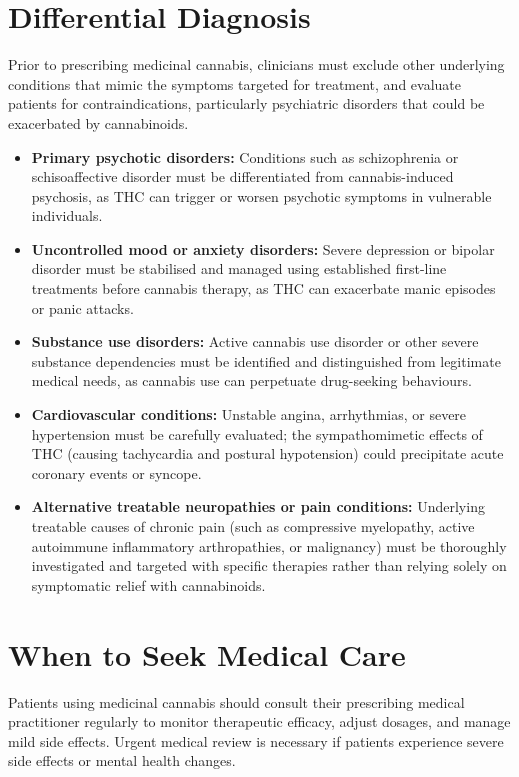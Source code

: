 \section*{Differential Diagnosis}
Prior to prescribing medicinal cannabis, clinicians must exclude other underlying conditions that mimic the symptoms targeted for treatment, and evaluate patients for contraindications, particularly psychiatric disorders that could be exacerbated by cannabinoids.
\begin{itemize}
    \item \textbf{Primary psychotic disorders:} Conditions such as schizophrenia or schisoaffective disorder must be differentiated from cannabis-induced psychosis, as THC can trigger or worsen psychotic symptoms in vulnerable individuals.
    \item \textbf{Uncontrolled mood or anxiety disorders:} Severe depression or bipolar disorder must be stabilised and managed using established first-line treatments before cannabis therapy, as THC can exacerbate manic episodes or panic attacks.
    \item \textbf{Substance use disorders:} Active cannabis use disorder or other severe substance dependencies must be identified and distinguished from legitimate medical needs, as cannabis use can perpetuate drug-seeking behaviours.
    \item \textbf{Cardiovascular conditions:} Unstable angina, arrhythmias, or severe hypertension must be carefully evaluated; the sympathomimetic effects of THC (causing tachycardia and postural hypotension) could precipitate acute coronary events or syncope.
    \item \textbf{Alternative treatable neuropathies or pain conditions:} Underlying treatable causes of chronic pain (such as compressive myelopathy, active autoimmune inflammatory arthropathies, or malignancy) must be thoroughly investigated and targeted with specific therapies rather than relying solely on symptomatic relief with cannabinoids.
\end{itemize}

\section*{When to Seek Medical Care}
Patients using medicinal cannabis should consult their prescribing medical practitioner regularly to monitor therapeutic efficacy, adjust dosages, and manage mild side effects. Urgent medical review is necessary if patients experience severe side effects or mental health changes.

